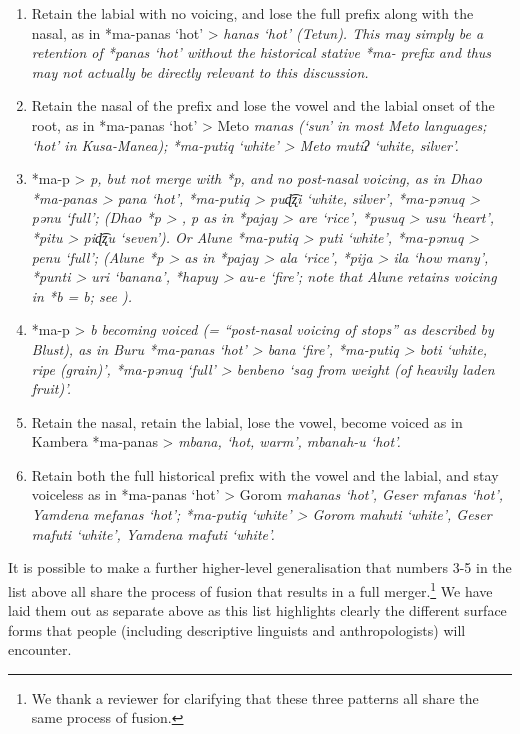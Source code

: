 \begin{enumerate}
	\item	Retain the labial with no voicing,
				and lose the full prefix along with the nasal,
				as in *ma-panas ‘hot’ > \it{hanas} ‘hot’ (Tetun).
				This may simply be a retention of *panas ‘hot’ without the historical
				stative *ma- prefix and thus may not actually be directly relevant to this discussion.
	\item	Retain the nasal of the prefix
				and lose the vowel
				and the labial onset of the root,
				as in *ma-panas ‘hot’ > Meto \it{manas} (‘sun’ in most Meto languages;
				‘hot’ in Kusa-Manea); *ma-putiq ‘white’ > Meto \it{mutiʔ} ‘white, silver’.
	\item	*ma-p > \it{p},
				but not merge with *p,
				and no post-nasal voicing,
				as in Dhao *ma-panas > \it{pana} ‘hot’,
				*ma-putiq > \it{puɖ͡ʐi} ‘white,
				silver’, *ma-pənuq > \it{pənu} ‘full’; (Dhao *p > {\0},
				\it{p} as in *pajay > \it{are} ‘rice’,
				*pusuq > \it{usu} ‘heart’,
				*pitu > \it{piɖ͡ʐu} ‘seven’).
				Or Alune *ma-putiq > \it{puti} ‘white’,
				*ma-pənuq > \it{penu} ‘full’; (Alune *p > {\0} as in *pajay >
				\it{ala} ‘rice’, *pija > \it{ila} ‘how many’,
				*punti > \it{uri} ‘banana’,
				*hapuy > \it{au-e} ‘fire’; note that Alune retains voicing in
				*b = \it{b}; see ).
	\item	*ma-p > \it{b} becoming voiced (= “post-nasal voicing of
				stops” as described by Blust),
				as in Buru *ma-panas ‘hot’ > \it{bana} ‘fire’,
				*ma-putiq > \it{boti} ‘white,
				ripe (grain)’, *ma-pənuq ‘full’ > \it{ben{\tl}beno} ‘sag from weight
				(of heavily laden fruit)’.
	\item	Retain the nasal,
				retain the labial, lose the vowel,
				become voiced as in Kambera *ma-panas > \it{mbana},
				‘hot, warm’, \it{mbanah-u} ‘hot’.
	\item	Retain both the full historical prefix with the vowel
				and the labial, and stay voiceless as in *ma-panas ‘hot’ > Gorom
				\it{mahanas} ‘hot’, Geser \it{mfanas} ‘hot’, Yamdena \it{mefanas} ‘hot’; *ma-putiq
				‘white’ > Gorom \it{mahuti} ‘white’,
				Geser \it{mafuti} ‘white’, Yamdena \it{mafuti} ‘white’.
\end{enumerate}

It is possible to make a further higher-level generalisation
that numbers 3-5 in the list above all share the process of fusion
that results in a full merger.\footnote{
		We thank a reviewer for clarifying that these three patterns all share the same process of fusion.}
We have laid them out as separate above as this list highlights
clearly the different surface forms that people (including descriptive
linguists and anthropologists) will encounter.

